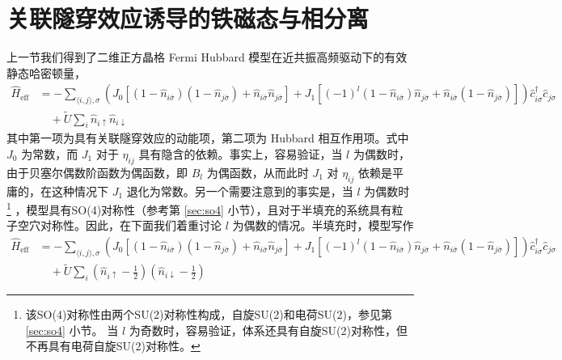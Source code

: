 \section{关联隧穿效应诱导的铁磁态与相分离} \label{sec:floqhubb}

上一节我们得到了二维正方晶格 Fermi Hubbard 模型在近共振高频驱动下的有效静态哈密顿量，
\begin{align}
\hat{H}_{\text{eff}} &= - \sum_{\langle i,j\rangle, \sigma} 
\left(J_0[(1-\hat{n}_{i\bar\sigma})(1-\hat{n}_{j\bar\sigma}) + \hat{n}_{i\bar\sigma}\hat{n}_{j\bar\sigma}]
+J_1[(-1)^l(1-\hat{n}_{i\bar\sigma})\hat{n}_{j\bar\sigma} + \hat{n}_{i\bar\sigma}(1-\hat{n}_{j\bar\sigma})]\right)
\hat{c}_{i\sigma}^{\dagger}\hat{c}_{j\sigma} \nonumber\\
& \quad + \tilde{U}\sum_{i}\hat{n}_{i\uparrow}\hat{n}_{i\downarrow}
\end{align}
其中第一项为具有关联隧穿效应的动能项，第二项为 Hubbard 相互作用项。式中 $J_0$ 为常数，而 $J_1$ 对于 $\eta_{ij}$ 具有隐含的依赖。事实上，容易验证，当 $l$ 为偶数时，由于贝塞尔偶数阶函数为偶函数，即 $B_l$ 为偶函数，从而此时 $J_1$ 对 $\eta_{ij}$ 依赖是平庸的，在这种情况下 $J_1$ 退化为常数。另一个需要注意到的事实是，当 $l$ 为偶数时
\footnote{该SO(4)对称性由两个SU(2)对称性构成，自旋SU(2)和电荷SU(2)，参见第 \ref{sec:so4} 小节。 当 $l$ 为奇数时，容易验证，体系还具有自旋SU(2)对称性，但不再具有电荷自旋SU(2)对称性。}
，模型具有SO(4)对称性（参考第 \ref{sec:so4} 小节），且对于半填充的系统具有粒子空穴对称性。因此，在下面我们着重讨论 $l$ 为偶数的情况。半填充时，模型写作
\begin{align}
\hat{H}_{\text{eff}} &= - \sum_{\langle i,j\rangle, \sigma} 
\left(J_0[(1-\hat{n}_{i\bar\sigma})(1-\hat{n}_{j\bar\sigma}) + \hat{n}_{i\bar\sigma}\hat{n}_{j\bar\sigma}]
+J_1[(-1)^l(1-\hat{n}_{i\bar\sigma})\hat{n}_{j\bar\sigma} + \hat{n}_{i\bar\sigma}(1-\hat{n}_{j\bar\sigma})]\right)
\hat{c}_{i\sigma}^{\dagger}\hat{c}_{j\sigma} \nonumber\\
& \quad + \tilde{U}\sum_{i}\left(\hat{n}_{i\uparrow}-\frac{1}{2}\right)\left(\hat{n}_{i\downarrow}-\frac{1}{2}\right)
\end{align}


